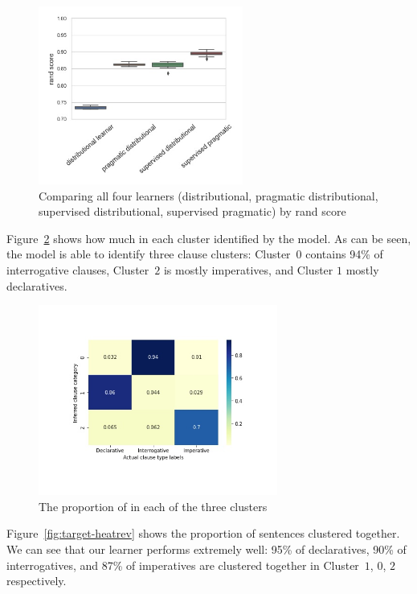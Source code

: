 \begin{figure}[H]
    \centering
    \includegraphics[width=0.6\textwidth]{figures/compare-rand.jpg}
    \caption{Comparing all four learners (distributional, pragmatic distributional, supervised distributional, supervised pragmatic) by rand score }
    \label{fig:compare-rand}
\end{figure}




Figure~\ref{fig:target-heatmap} shows how much \diis{} in each cluster identified by the model. As can be seen, the model is able to identify three clause clusters: Cluster~$0$ contains 94\% of interrogative clauses, Cluster~$2$ is mostly imperatives, and Cluster $1$ mostly declaratives. 

\begin{figure}[H]
    \centering
    \includegraphics[width=0.7\textwidth]{figures/target-heatmap.jpg}
    \caption{The proportion of \diis{} in each of the three clusters}
    \label{fig:target-heatmap}
\end{figure}

Figure~\ref{fig:target-heatrev} shows the proportion of sentences clustered together. We can see that our learner performs extremely well: 95\% of declaratives, 90\% of interrogatives, and 87\% of imperatives are clustered together in Cluster~$1$, $0$, $2$ respectively.



